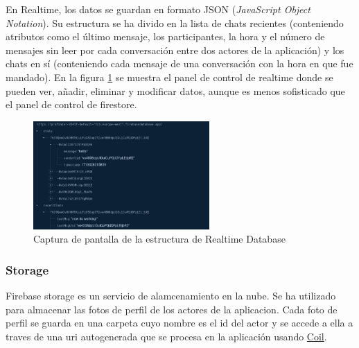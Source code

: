 En Realtime, los datos se guardan en formato JSON (\textit{JavaScript Object Notation}). Su estructura se ha divido en la lista de chats recientes (conteniendo atributos como el último mensaje, los participantes, la hora y el número de mensajes sin leer por cada conversación entre dos actores de la aplicación) y los chats en sí (conteniendo cada mensaje de una conversación con la hora en que fue mandado). En la figura \ref{fig:ejemplo_realtime} se muestra el panel de control de realtime donde se pueden ver, añadir, eliminar y modificar datos, aunque es menos sofisticado que el panel de control de firestore.
\begin{figure}[h]
    \centering
    \includegraphics[width = 0.6\textwidth]{Imagenes/Fuentes/ejemplo_realtime.png}
    \caption{Captura de pantalla de la estructura de Realtime Database}
    \label{fig:ejemplo_realtime}
\end{figure}
\subsubsection{Storage}
Firebase storage\hyperlink{cap:biblio}{} es un servicio de alamcenamiento en la nube. Se ha utilizado para almacenar las fotos de perfil de los actores de la aplicacion. Cada foto de perfil se guarda en una carpeta cuyo nombre es el id del actor y se accede a ella a traves de una uri autogenerada que se procesa en la aplicación usando \hyperlink{subsec:coil}{Coil}.

\hypertarget{subsec:datastore}{}
